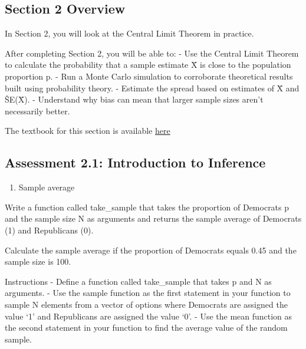 \documentclass[
]{article}
\providecommand{\tightlist}{%
  \setlength{\itemsep}{0pt}\setlength{\parskip}{0pt}}
\begin{document}
\hypertarget{section-2-overview}{%
\subsection{Section 2 Overview}\label{section-2-overview}}

In Section 2, you will look at the Central Limit Theorem in practice.

After completing Section 2, you will be able to: - Use the Central Limit
Theorem to calculate the probability that a sample estimate X̄ is close
to the population proportion p. - Run a Monte Carlo simulation to
corroborate theoretical results built using probability theory. -
Estimate the spread based on estimates of X̄ and ŜE(X̄). - Understand why
bias can mean that larger sample sizes aren't necessarily better.

The textbook for this section is available
\href{https://rafalab.github.io/dsbook/random-variables.html\#central-limit-theorem}{here}

\hypertarget{assessment-2.1-introduction-to-inference}{%
\subsection{Assessment 2.1: Introduction to
Inference}\label{assessment-2.1-introduction-to-inference}}

\begin{enumerate}
\def\labelenumi{\arabic{enumi}.}
\tightlist
\item
  Sample average
\end{enumerate}

Write a function called take\_sample that takes the proportion of
Democrats p and the sample size N as arguments and returns the sample
average of Democrats (1) and Republicans (0).

Calculate the sample average if the proportion of Democrats equals 0.45
and the sample size is 100.

Instructions - Define a function called take\_sample that takes p and N
as arguments. - Use the sample function as the first statement in your
function to sample N elements from a vector of options where Democrats
are assigned the value `1' and Republicans are assigned the value `0'. -
Use the mean function as the second statement in your function to find
the average value of the random sample.
\end{document}
